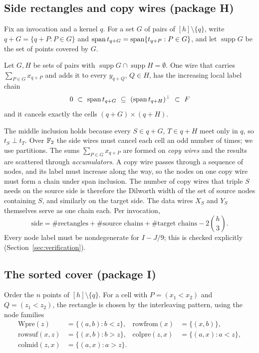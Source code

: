 \subsection{Side rectangles and copy wires (package H)}

Fix an invocation and a kernel $q$. For a set $G$ of pairs of $[h]\setminus\{q\}$, write $q+G = \{q+P : P\in G\}$ and $\operatorname{span} t_{q+G} = \operatorname{span}\{t_{q+P}: P\in G\}$, and let $\operatorname{supp} G$ be the set of points covered by $G$.

\begin{lemma}\label{lem:rect}
Let $G, H$ be sets of pairs with $\operatorname{supp} G\cap\operatorname{supp} H = \emptyset$. One wire that carries $\sum_{P\in G}x_{q+P}$ and adds it to every $y_{q+Q}$, $Q\in H$, has the increasing local label chain
\[
0 \ \subset\ \spn t_{q+G}\ \subseteq\ (\spn t_{q+H})^\perp\ \subset\ F
\]
and it cancels exactly the cells $(q+G)\times(q+H)$.
\end{lemma}

The middle inclusion holds because every $S\in q+G$, $T\in q+H$ meet only in $q$, so $t_S\perp t_T$. Over $\mathbb{F}_2$ the side wires must cancel each cell an odd number of times; we use partitions. The sums $\sum_{P\in G}x_{q+P}$ are formed on \emph{copy wires} and the results are scattered through \emph{accumulators}. A copy wire passes through a sequence of nodes, and its label must increase along the way, so the nodes on one copy wire must form a chain under span inclusion. The number of copy wires that triple $S$ needs on the source side is therefore the Dilworth width \cite{Dilworth} of the set of source nodes containing $S$, and similarly on the target side. The data wires $X_S$ and $Y_S$ themselves serve as one chain each. Per invocation,
\begin{equation}\label{eq:side}
\mathrm{side} = \#\text{rectangles} + \#\text{source chains} + \#\text{target chains} - 2\binom h3 .
\end{equation}
Every node label must be nondegenerate for $I-J/9$; this is checked explicitly (Section~\ref{sec:verification}).

\subsection{The sorted cover (package I)}

Order the $n$ points of $[h]\setminus\{q\}$. For a cell with $P = (x_1<x_2)$ and $Q = (z_1<z_2)$, the rectangle is chosen by the interleaving pattern, using the node families
\begin{align*}
\mathrm{Wpre}(z) &= \{(a,b) : b<z\}, & \mathrm{rowfrom}(x) &= \{(x,b)\},\\
\mathrm{rowsuf}(x,z) &= \{(x,b): b>z\}, & \mathrm{colpre}(z,x) &= \{(a,x): a<z\},\\
\mathrm{colmid}(z,x) &= \{(a,x): a>z\}.
\end{align*}

